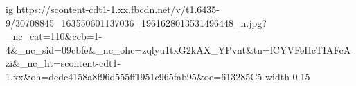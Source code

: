  
 
 
 
 

\par
\ifcmt
  ig https://scontent-cdt1-1.xx.fbcdn.net/v/t1.6435-9/30708845_163550601137036_1961628013531496448_n.jpg?_nc_cat=110&ccb=1-4&_nc_sid=09cbfe&_nc_ohc=zqlyu1txG2kAX_YPvnt&tn=lCYVFeHcTIAFcAzi&_nc_ht=scontent-cdt1-1.xx&oh=dedc4158a8f96d555ff1951c965fab95&oe=613285C5
  width 0.15
\fi

